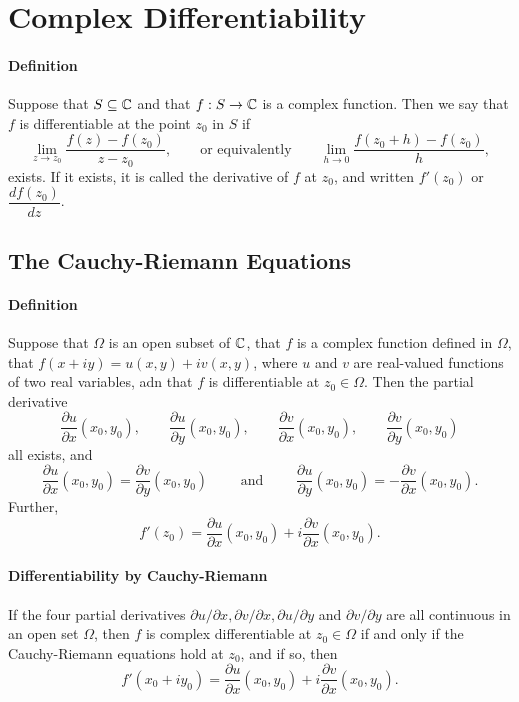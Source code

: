 \section{Complex Differentiability}

\paragraph{Definition}
Suppose that \(S \subseteq \mathbb{C}\) and that \(f: S \to \mathbb{C}\) is a complex function. Then we say that \(f\) is differentiable at the point \(z_0\) in \(S\) if
\[\lim_{z \to z_0} \frac{f(z) - f(z_0)}{z - z_0}, \qquad \text{or equivalently} \qquad \lim_{h \to 0}\frac{f(z_0 + h) - f(z_0)}{h},\]
exists. If it exists, it is called the derivative of \(f\) at \(z_0\), and written \(f'(z_0)\) or \(\dfrac{df(z_0)}{dz}\).


\subsection{The Cauchy-Riemann Equations}

\paragraph{Definition}
Suppose that \(\Omega\) is an open subset of \(\mathbb{C}\), that \(f\) is a complex function defined in \(\Omega\), that \(f(x + iy) = u(x,y) + iv(x,y)\), where \(u\) and \(v\) are real-valued functions of two real variables, adn that \(f\) is differentiable at \(z_0 \in \Omega\). Then the partial derivative
\[\frac{\partial u}{\partial x}(x_0, y_0), \qquad \frac{\partial u}{\partial y}(x_0, y_0), \qquad \frac{\partial v}{\partial x}(x_0, y_0), \qquad \frac{\partial v}{\partial y}(x_0, y_0)\]
all exists, and
\[\frac{\partial u}{\partial x}(x_0, y_0) = \frac{\partial v}{\partial y}(x_0, y_0) \qquad \text{ and } \qquad \frac{\partial u}{\partial y}(x_0, y_0) = -\frac{\partial v}{\partial x}(x_0, y_0).\]
Further,
\[f'(z_0) = \frac{\partial u}{\partial x}(x_0, y_0) + i\frac{\partial v}{\partial x}(x_0, y_0).\]

\paragraph{Differentiability by Cauchy-Riemann}
If the four partial derivatives \(\partial u / \partial x, \partial v / \partial x, \partial u / \partial y\) and \(\partial v / \partial y\) are all continuous in an open set \(\Omega\), then \(f\) is complex differentiable at \(z_0 \in \Omega\) if and only if the Cauchy-Riemann equations hold at \(z_0\), and if so, then
\[f'(x_0 + iy_0) = \frac{\partial u}{\partial x}(x_0, y_0) + i\frac{\partial v}{\partial x}(x_0, y_0).\]


